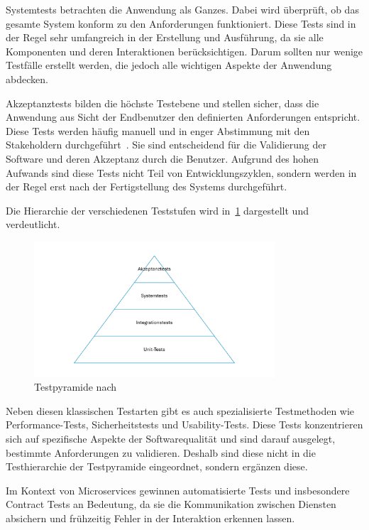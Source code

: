 Systemtests betrachten die Anwendung als Ganzes.
Dabei wird überprüft, ob das gesamte System konform zu den Anforderungen funktioniert.
Diese Tests sind in der Regel sehr umfangreich in der Erstellung und Ausführung, da sie alle Komponenten und deren Interaktionen berücksichtigen.
Darum sollten nur wenige Testfälle erstellt werden, die jedoch alle wichtigen Aspekte der Anwendung abdecken.

Akzeptanztests bilden die höchste Testebene und stellen sicher, dass die Anwendung aus Sicht der Endbenutzer den definierten Anforderungen entspricht.
Diese Tests werden häufig manuell und in enger Abstimmung mit den Stakeholdern durchgeführt~\cite{singhSoftwareTesting2011}.
Sie sind entscheidend für die Validierung der Software und deren Akzeptanz durch die Benutzer.
Aufgrund des hohen Aufwands sind diese Tests nicht Teil von Entwicklungszyklen, sondern werden in der Regel erst nach der Fertigstellung des Systems durchgeführt.

Die Hierarchie der verschiedenen Teststufen wird in~\cref{fig:testpyramid} dargestellt und verdeutlicht.

\begin{figure}[ht]
    \centering
    \includegraphics[width=0.8\textwidth]{figures/Testpyramide}
    \caption{Testpyramide nach \cite{linzBasiswissenSoftwaretest2024}}
    \label{fig:testpyramid}
\end{figure}

Neben diesen klassischen Testarten gibt es auch spezialisierte Testmethoden wie Performance-Tests, Sicherheitstests und Usability-Tests.
Diese Tests konzentrieren sich auf spezifische Aspekte der Softwarequalität und sind darauf ausgelegt, bestimmte Anforderungen zu validieren.
Deshalb sind diese nicht in die Testhierarchie der Testpyramide eingeordnet, sondern ergänzen diese.

Im Kontext von Microservices gewinnen automatisierte Tests und insbesondere Contract Tests an Bedeutung, da sie die Kommunikation zwischen Diensten absichern und frühzeitig Fehler in der Interaktion erkennen lassen.


